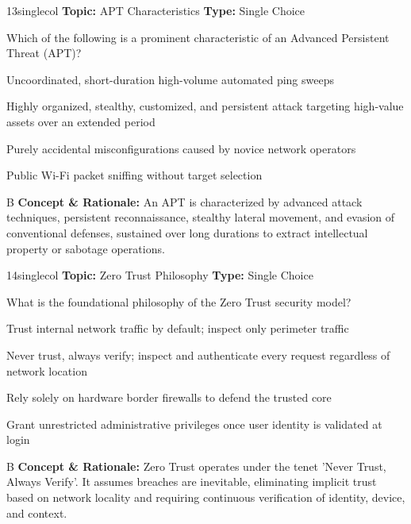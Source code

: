 \begin{qcard}{13}{singlecol}
\textcolor{darkslate!75}{\small\textbf{Topic:} APT Characteristics \hfill \textbf{Type:} Single Choice}\vspace{0.4em}\par
Which of the following is a prominent characteristic of an Advanced Persistent Threat (APT)?
\begin{qoptions}
\item Uncoordinated, short-duration high-volume automated ping sweeps
\item Highly organized, stealthy, customized, and persistent attack targeting high-value assets over an extended period
\item Purely accidental misconfigurations caused by novice network operators
\item Public Wi-Fi packet sniffing without target selection
\end{qoptions}
\end{qcard}
\nopagebreak
\begin{explainbox}{B}
\textbf{Concept \& Rationale:} An APT is characterized by advanced attack techniques, persistent reconnaissance, stealthy lateral movement, and evasion of conventional defenses, sustained over long durations to extract intellectual property or sabotage operations.
\end{explainbox}

\begin{qcard}{14}{singlecol}
\textcolor{darkslate!75}{\small\textbf{Topic:} Zero Trust Philosophy \hfill \textbf{Type:} Single Choice}\vspace{0.4em}\par
What is the foundational philosophy of the Zero Trust security model?
\begin{qoptions}
\item Trust internal network traffic by default; inspect only perimeter traffic
\item Never trust, always verify; inspect and authenticate every request regardless of network location
\item Rely solely on hardware border firewalls to defend the trusted core
\item Grant unrestricted administrative privileges once user identity is validated at login
\end{qoptions}
\end{qcard}
\nopagebreak
\begin{explainbox}{B}
\textbf{Concept \& Rationale:} Zero Trust operates under the tenet 'Never Trust, Always Verify'. It assumes breaches are inevitable, eliminating implicit trust based on network locality and requiring continuous verification of identity, device, and context.
\end{explainbox}

